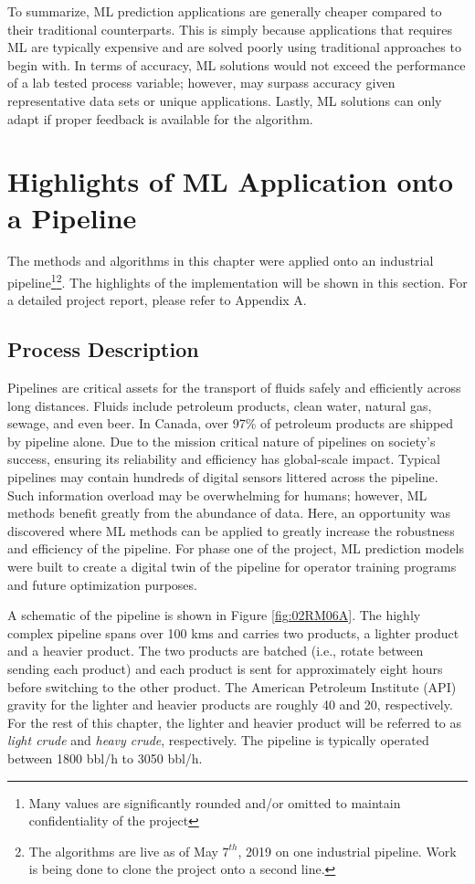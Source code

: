 To summarize, ML prediction applications are generally cheaper compared to their traditional counterparts.  This is simply because applications that requires ML are typically expensive and are solved poorly using traditional approaches to begin with.  In terms of accuracy, ML solutions would not exceed the performance of a lab tested process variable; however, may surpass accuracy given representative data sets or unique applications.  Lastly, ML solutions can only adapt if proper feedback is available for the algorithm. 

\section{Highlights of ML Application onto a Pipeline}

The methods and algorithms in this chapter were applied onto an industrial pipeline\footnote{Many values are significantly rounded and/or omitted to maintain confidentiality of the project}\footnote{The algorithms are live as of May $7^{th}$, 2019 on one industrial pipeline. Work is being done to clone the project onto a second line.}.  The highlights of the implementation will be shown in this section.  For a detailed project report, please refer to Appendix A.

\subsection{Process Description}
Pipelines are critical assets for the transport of fluids safely and efficiently across long distances. Fluids include petroleum products, clean water, natural gas, sewage, and even beer. In Canada, over 97\% of petroleum products are shipped by pipeline alone.  Due to the mission critical nature of pipelines on society's success, ensuring its reliability and efficiency has global-scale impact.  Typical pipelines may contain hundreds of digital sensors littered across the pipeline.  Such information overload may be overwhelming for humans; however, ML methods benefit greatly from the abundance of data.  Here, an opportunity was discovered where ML methods can be applied to greatly increase the robustness and efficiency of the pipeline.  For phase one of the project, ML prediction models were built to create a digital twin of the pipeline for operator training programs and future optimization purposes.

A schematic of the pipeline is shown in Figure \ref{fig:02RM06A}.  The highly complex pipeline spans over 100 kms and carries two products, a lighter product and a heavier product. The two products are batched (i.e., rotate between sending each product) and each product is sent for approximately eight hours before switching to the other product. The American Petroleum Institute (API) gravity for the lighter and heavier products are roughly 40 and 20, respectively. For the rest of this chapter, the lighter and heavier product will be referred to as \textit{light crude} and \textit{heavy crude}, respectively. The pipeline is typically operated between 1800 bbl/h to 3050 bbl/h. 

